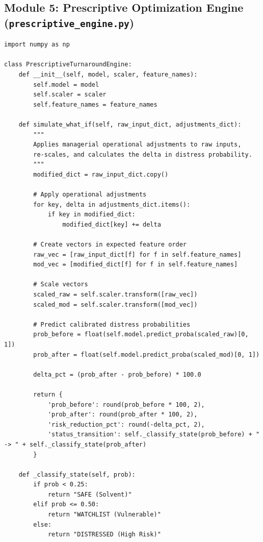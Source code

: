 \documentclass[11pt, a4paper]{article}
\begin{document}
\subsection{Module 5: Prescriptive Optimization Engine (\texttt{prescriptive\_engine.py})}
\begin{verbatim}
import numpy as np

class PrescriptiveTurnaroundEngine:
    def __init__(self, model, scaler, feature_names):
        self.model = model
        self.scaler = scaler
        self.feature_names = feature_names
        
    def simulate_what_if(self, raw_input_dict, adjustments_dict):
        """
        Applies managerial operational adjustments to raw inputs,
        re-scales, and calculates the delta in distress probability.
        """
        modified_dict = raw_input_dict.copy()
        
        # Apply operational adjustments
        for key, delta in adjustments_dict.items():
            if key in modified_dict:
                modified_dict[key] += delta
                
        # Create vectors in expected feature order
        raw_vec = [raw_input_dict[f] for f in self.feature_names]
        mod_vec = [modified_dict[f] for f in self.feature_names]
        
        # Scale vectors
        scaled_raw = self.scaler.transform([raw_vec])
        scaled_mod = self.scaler.transform([mod_vec])
        
        # Predict calibrated distress probabilities
        prob_before = float(self.model.predict_proba(scaled_raw)[0, 1])
        prob_after = float(self.model.predict_proba(scaled_mod)[0, 1])
        
        delta_pct = (prob_after - prob_before) * 100.0
        
        return {
            'prob_before': round(prob_before * 100, 2),
            'prob_after': round(prob_after * 100, 2),
            'risk_reduction_pct': round(-delta_pct, 2),
            'status_transition': self._classify_state(prob_before) + " -> " + self._classify_state(prob_after)
        }
        
    def _classify_state(self, prob):
        if prob < 0.25:
            return "SAFE (Solvent)"
        elif prob <= 0.50:
            return "WATCHLIST (Vulnerable)"
        else:
            return "DISTRESSED (High Risk)"
\end{verbatim}
\end{document}
